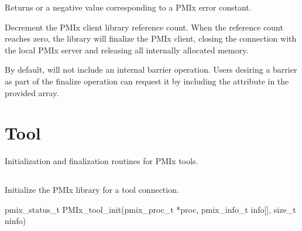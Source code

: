 \begin{arglist}
\end{arglist}

Returns  or a negative value corresponding to a PMIx error constant.

\descr

Decrement the \ac{PMIx} client library reference count.
When the reference count reaches zero, the library will finalize the \ac{PMIx} client, closing the connection with the local \ac{PMIx} server and releasing all internally allocated memory.

By default,  will not include an internal barrier operation.
Users desiring a barrier as part of the finalize operation can request it by including the  attribute in the provided  array.



\section{Tool}
\label{chap:api_init:tool}

Initialization and finalization routines for \ac{PMIx} tools.

\subsection{}

\summary

Initialize the \ac{PMIx} library for a tool connection.

\format

\cspecificstart
\begin{codepar}
pmix_status_t
PMIx_tool_init(pmix_proc_t *proc,
               pmix_info_t info[], size_t ninfo)
\end{codepar}
\cspecificend

\begin{arglist}
\end{arglist}


